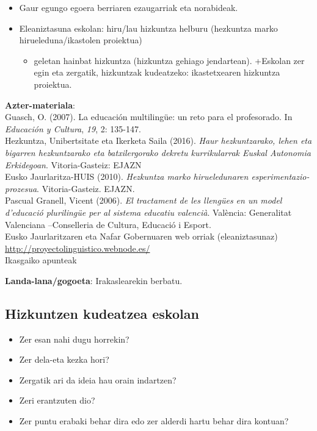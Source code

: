 \documentclass[
]{book}
\providecommand{\tightlist}{%
  \setlength{\itemsep}{0pt}\setlength{\parskip}{0pt}}
\begin{document}
\begin{itemize}
\tightlist
\item
  Gaur egungo egoera berriaren ezaugarriak eta norabideak.
\item
  Eleaniztasuna eskolan: hiru/lau hizkuntza helburu (hezkuntza marko hirueleduna/ikastolen proiektua)

  \begin{itemize}
  \tightlist
  \item
    geletan hainbat hizkuntza (hizkuntza gehiago jendartean).
    +Eskolan zer egin eta zergatik, hizkuntzak kudeatzeko: ikastetxearen hizkuntza proiektua.
  \end{itemize}
\end{itemize}

\textbf{Azter-materiala}:\\
Guasch, O. (2007). La educación multilingüe: un reto para el profesorado. In \emph{Educación y Cultura}, \emph{19}, 2: 135-147.\\
Hezkuntza, Unibertsitate eta Ikerketa Saila (2016). \emph{Haur hezkuntzarako, lehen eta bigarren hezkuntzarako eta batxilergorako dekretu kurrikularrak Euskal Autonomia Erkidegoan}. Vitoria-Gasteiz: EJAZN\\
Eusko Jaurlaritza-HUIS (2010). \emph{Hezkuntza marko hirueledunaren esperimentazio-prozesua}. Vitoria-Gasteiz. EJAZN.\\
Pascual Granell, Vicent (2006). \emph{El tractament de les llengües en un model d'educació plurilingüe per al sistema educatiu valencià}. València: Generalitat Valenciana --Conselleria de Cultura, Educació i Esport.\\
Eusko Jaurlaritzaren eta Nafar Gobernuaren web orriak (eleaniztasunaz)\\
\url{http://proyectolinguistico.webnode.es/}~\\
Ikasgaiko apunteak

\textbf{Landa-lana/gogoeta}: Irakaslearekin berbatu.

\hypertarget{hizkuntzen-kudeatzea-eskolan}{%
\subsection*{Hizkuntzen kudeatzea eskolan}\label{hizkuntzen-kudeatzea-eskolan}}

\begin{itemize}
\tightlist
\item
  Zer esan nahi dugu horrekin?
\item
  Zer dela-eta kezka hori?
\item
  Zergatik ari da ideia hau orain indartzen?
\item
  Zeri erantzuten dio?
\item
  Zer puntu erabaki behar dira edo zer alderdi hartu behar dira kontuan?
\end{itemize}
\end{document}
